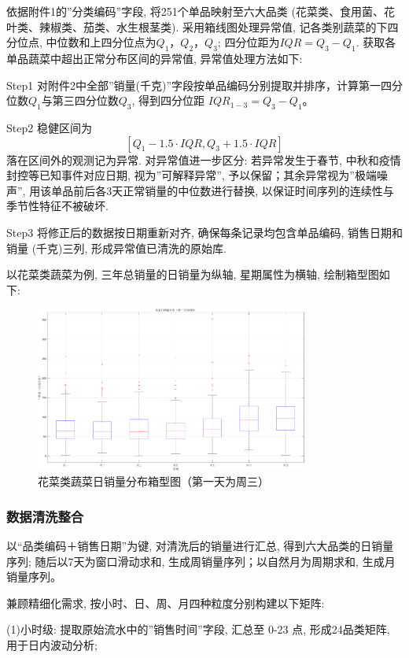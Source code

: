\documentclass{cumcmthesis}
\begin{document}
依据附件1的''分类编码''字段, 将251个单品映射至六大品类 (花菜类、食用菌、花叶类、辣椒类、茄类、水生根茎类). 采用箱线图处理异常值, 记各类别蔬菜的下四分位点, 中位数和上四分位点为$Q_1$，$Q_2$，$Q_3$; 四分位距为$IQR=Q_3-Q_1$. 获取各单品蔬菜中超出正常分布区间的异常值, 异常值处理方法如下:

Step1 对附件2中全部''销量(千克)''字段按单品编码分别提取并排序，计算第一四分位数$Q_1$与第三四分位数$Q_3$, 得到四分位距 $IQR_{1-3}=Q_3-Q_1$。

Step2 稳健区间为
\[ [Q_1 - 1.5 \cdot IQR, Q_3 + 1.5 \cdot IQR] \]
落在区间外的观测记为异常. 对异常值进一步区分: 
若异常发生于春节, 中秋和疫情封控等已知事件对应日期, 视为''可解释异常'', 予以保留；其余异常视为''极端噪声'', 用该单品前后各3天正常销量的中位数进行替换, 以保证时间序列的连续性与季节性特征不被破坏.  

Step3 将修正后的数据按日期重新对齐, 确保每条记录均包含单品编码, 销售日期和销量 (千克)三列, 形成异常值已清洗的原始库. 

以花菜类蔬菜为例, 三年总销量的日销量为纵轴, 星期属性为横轴, 绘制箱型图如下: 
\begin{figure}[H]
    \centering
    \includegraphics[width=0.8\textwidth]{花菜日销量分布(第一天为周3).png} 
    \caption{花菜类蔬菜日销量分布箱型图（第一天为周三）}
\end{figure}


\subsubsection{数据清洗整合}

以“品类编码＋销售日期”为键, 对清洗后的销量进行汇总, 得到六大品类的日销量序列; 随后以7天为窗口滑动求和, 生成周销量序列；以自然月为周期求和, 生成月销量序列。  

兼顾精细化需求, 按小时、日、周、月四种粒度分别构建以下矩阵: 

(1)小时级: 提取原始流水中的''销售时间''字段, 汇总至 0-23 点, 形成24品类矩阵, 用于日内波动分析; 
\end{document}
